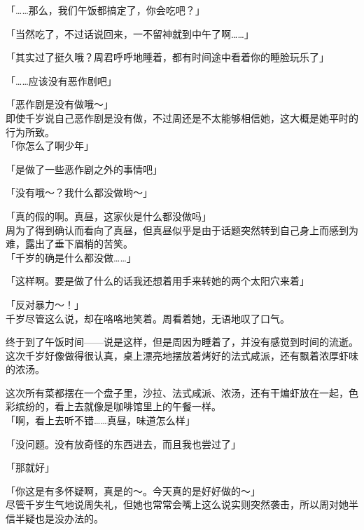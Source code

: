 「……那么，我们午饭都搞定了，你会吃吧？」

「当然吃了，不过话说回来，一不留神就到中午了啊……」

「其实过了挺久哦？周君呼呼地睡着，都有时间途中看着你的睡脸玩乐了」

「……应该没有恶作剧吧」

「恶作剧是没有做哦～」\\

即使千岁说自己恶作剧是没有做，不过周还是不太能够相信她，这大概是她平时的行为所致。\\

「你怎么了啊少年」

「是做了一些恶作剧之外的事情吧」

「没有哦～？我什么都没做哟～」

「真的假的啊。真昼，这家伙是什么都没做吗」\\

周为了得到确认而看向了真昼，但真昼似乎是由于话题突然转到自己身上而感到为难，露出了垂下眉梢的苦笑。\\

「千岁的确是什么都没做……」

「这样啊。要是做了什么的话我还想着用手来转她的两个太阳穴来着」

「反对暴力～！」\\

千岁尽管这么说，却在咯咯地笑着。周看着她，无语地叹了口气。\\

\vspace{2\baselineskip}

终于到了午饭时间——说是这样，但是周因为睡着了，并没有感觉到时间的流逝。\\

这次千岁好像做得很认真，桌上漂亮地摆放着烤好的法式咸派，还有飘着浓厚虾味的浓汤。

这次所有菜都摆在一个盘子里，沙拉、法式咸派、浓汤，还有干煸虾放在一起，色彩缤纷的，看上去就像是咖啡馆里上的午餐一样。\\

「啊，看上去听不错……真昼，味道怎么样」

「没问题。没有放奇怪的东西进去，而且我也尝过了」

「那就好」

「你这是有多怀疑啊，真是的～。今天真的是好好做的～」\\

尽管千岁生气地说周失礼，但她也常常会嘴上这么说实则突然袭击，所以周对她半信半疑也是没办法的。


